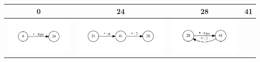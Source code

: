 \begin{table}[h]
  \centering
  \begin{tabular}{ | c | c | c | c | }
    \hline
    0 & 24 & 28 & 41 \\ \hline
    \begin{minipage}{.22\textwidth}
      \includegraphics[width=\linewidth]{Polubelova/0_tok}
    \end{minipage}
    &
    \begin{minipage}{.22\textwidth}
      \includegraphics[width=\linewidth]{Polubelova/24_tok}
    \end{minipage}
    & 
    \begin{minipage}{.22\textwidth}
      \includegraphics[width=\linewidth]{Polubelova/28_tok}

\end{minipage}
\end{tabular}
\end{table}
